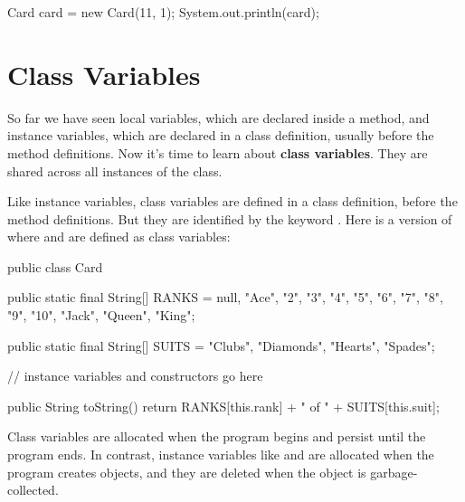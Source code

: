 \begin{code}
Card card = new Card(11, 1);
System.out.println(card);
\end{code}


\section{Class Variables}
\label{classvar}


So far we have seen local variables, which are declared inside a method, and instance variables, which are declared in a class definition, usually before the method definitions.
Now it's time to learn about {\bf class variables}.
They are shared across all instances of the class.



Like instance variables, class variables are defined in a class definition, before the method definitions.
But they are identified by the keyword .
Here is a version of  where  and  are defined as class variables:

\begin{code}
public class Card {

    public static final String[] RANKS = {
        null, "Ace", "2", "3", "4", "5", "6", "7",
        "8", "9", "10", "Jack", "Queen", "King"};

    public static final String[] SUITS = {
        "Clubs", "Diamonds", "Hearts", "Spades"};

    // instance variables and constructors go here

    public String toString() {
        return RANKS[this.rank] + " of " + SUITS[this.suit];
    }
}
\end{code}


Class variables are allocated when the program begins and persist until the program ends.
In contrast, instance variables like  and  are allocated when the program creates  objects, and they are deleted when the object is garbage-collected.


